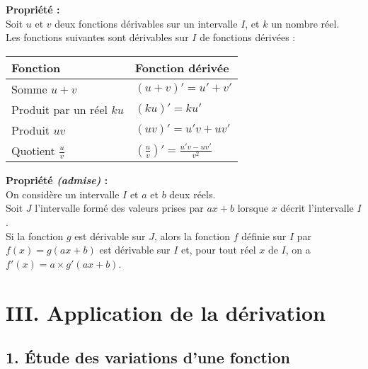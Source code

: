 \documentclass[11pt,a4paper]{article}
\begin{document}
\begin{mdframed}[style=proprieteStyle]
    \textbf{Propriété :} ~\\
    Soit $u$ et $v$ deux fonctions dérivables sur un intervalle $I$, et $k$ un nombre réel. \\
    Les fonctions suivantes sont dérivables sur $I$ de fonctions dérivées : \\

    \renewcommand{\arraystretch}{2}
    \begin{tabularx}{\linewidth}{|Y|Y|}
        \hline
        \textbf{Fonction}                     & \textbf{Fonction dérivée}                                      \\
        \hline
        Somme $u+v$                           & $(u+v)'=u'+v'$                                                 \\
        \hline
        Produit par un réel $ku$              & $(ku)'=ku'$                                                    \\
        \hline
        Produit $uv$                          & $(uv)'=u'v+uv'$                                                \\
        \hline
        Quotient $\displaystyle{}\frac{u}{v}$ & $\displaystyle{}\left(\frac{u}{v}\right)'=\frac{u'v-uv'}{v^2}$ \\
        \hline
    \end{tabularx}
\end{mdframed}

\begin{mdframed}[style=proprieteStyle]
    \textbf{Propriété \emph{(admise)} :} ~\\
    On considère un intervalle $I$ et $a$ et $b$ deux réels.\\
    Soit $J$ l'intervalle formé des valeurs prises par $ax+b$ lorsque $x$ décrit l'intervalle $I$.\\
    Si la fonction $g$ est dérivable sur $J$, alors la fonction $f$ définie sur $I$ par $f(x)=g(ax+b)$ est dérivable sur $I$ et, pour tout réel $x$ de $I$, on a $f'(x)=a\times g'(ax+b)$.
\end{mdframed}

\section*{III. Application de la dérivation}

\subsection*{1. Étude des variations d'une fonction}
\end{document}
